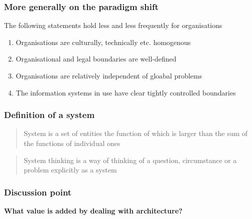 \begin{frame}
	\frametitle{More generally on the paradigm shift}
	The following statements hold less and less frequently for organisations
	\begin{enumerate}
		\item Organisations are culturally, technically etc. homogenous		

		\item Organisational and legal boundaries are well-defined

		\item Organisations are relatively independent of gloabal problems
		\item The information systems in use have clear tightly controlled boundaries
	
  \end{enumerate}

\end{frame}

\begin{frame}[fragile]
  \frametitle{Definition of a system}
		\begin{center}
  			\begin{quote}
				System is a set of entities the function of which is larger than the sum of the functions of individual ones
			\end{quote}
			\begin{quote}
				System thinking is a way of thinking of a question, circumstance or a problem explicitly as a system
			\end{quote}
		\end{center}
		\cite{crawley2015systems}
\end{frame}



\begin{frame}[fragile]
  \frametitle{Discussion point}
		\begin{center}
			\textbf{What value is added by dealing with architecture?}
		\end{center}
\end{frame}

